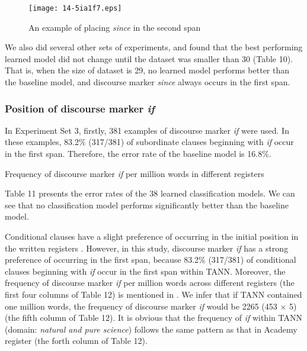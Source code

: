 \documentclass[english]{jnlp_1.3e}
\begin{document}
\begin{figure}[t]
\begin{center}
\texttt{[image: 14-5ia1f7.eps]}
\end{center}
 \caption{An example of placing \textit{since} in the second span}
\end{figure}
\begin{table}[t]

\end{table}


We also did several other sets of experiments, and found that
the best performing learned model did not change until the dataset was smaller 
than 30 (Table 10). That is, when the size of dataset is 29, 
no learned model performs better than the baseline model, and discourse
marker \textit{since} always occurs in the first span.




\subsubsection{Position of discourse marker \textit{if}}

In Experiment Set 3, firstly, 381 examples of discourse marker \textit{if} 
were used. In these examples, 83.2\% (317/381) of subordinate
clauses beginning with \textit{if} occur in the first span. 
Therefore, the error rate of the baseline model is 16.8\%.  

\begin{table}[b]

\end{table}
\begin{table}[b]
\caption{Frequency of discourse marker \textit{if} per million words in different registers}

\end{table}


Table 11 presents the error rates of the 38 learned classification models. 
We can see that no classification model performs significantly better 
than the baseline model. 

Conditional clauses have a slight preference 
of occurring in the initial position in the written registers \cite{Biber99}. 
However, in this study, discourse marker \textit{if} has a strong 
preference of occurring in the first span, because 83.2\% (317/381) 
of conditional clauses beginning with \textit{if} occur in 
the first span within TANN. Moreover, the frequency of discourse marker 
\textit{if} per million words across different registers 
(the first four columns of Table 12) is mentioned in \cite{Biber99}. 
We infer that if TANN contained one million words,
the frequency of discourse marker \textit{if} would be 2265 (453 $\times$ 5) 
(the fifth column of Table 12). It is obvious that the frequency of 
\textit{if} within TANN (domain: \textit{natural and pure science})
follows the same pattern as that in Academy register 
(the forth column of Table 12). 
\end{document}
